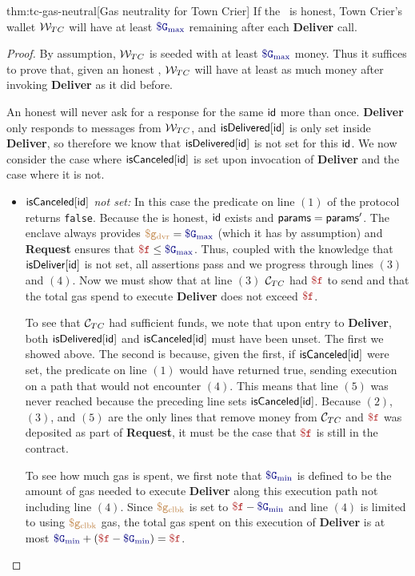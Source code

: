 \begin{retheorem}{thm:tc-gas-neutral}[Gas neutrality for Town Crier]
If the \tc~\medname is honest,
Town Crier's wallet ${\cal W}_{TC}$ will have at least $\constgasmax$ remaining after each {\bf Deliver} call.
\end{retheorem}

\begin{proof}
By assumption, ${\cal W}_{TC}$ is seeded with at least $\constgasmax$ money.
Thus it suffices to prove that, given an honest \medname, ${\cal W}_{TC}$ will have at least as much money after invoking {\bf Deliver} as it did before.

An honest \medname will never ask for a response for the same ${\sf id}$ more than once.
{\bf Deliver} only responds to messages from ${\cal W}_{TC}$, and ${\sf isDelivered}[{\sf id}]$ is only set inside {\bf Deliver},
so therefore we know that ${\sf isDelivered}[{\sf id}]$ is not set for this ${\sf id}$.
We now consider the case where ${\sf isCanceled}[{\sf id}]$ is set upon invocation of {\bf Deliver} and the case where it is not.
\begin{itemize}

\item {\it ${\sf isCanceled}[{\sf id}]$ not set:}
In this case the predicate on line $(1)$ of the protocol returns {\tt false}.
Because the \medname is honest, ${\sf id}$ exists and ${\sf params} = {\sf params}'$.
The enclave always provides $\gasdeliver = \constgasmax$ (which it has by assumption) and {\bf Request} ensures that $\fee \leq \constgasmax$.
Thus, coupled with the knowledge that ${\sf isDeliver}[{\sf id}]$ is not set, all assertions pass and we progress through lines $(3)$ and $(4)$.
Now we must show that at line $(3)$ ${\cal C}_{TC}$ had $\fee$ to send and that the total gas spend to execute {\bf Deliver} does not exceed $\fee$.

To see that ${\cal C}_{TC}$ had sufficient funds, we note that upon entry to {\bf Deliver}, both ${\sf isDelivered}[{\sf id}]$ and ${\sf isCanceled}[{\sf id}]$ must have been unset.
The first we showed above.
The second is because, given the first, if ${\sf isCanceled}[{\sf id}]$ were set, the predicate on line $(1)$ would have returned true, sending execution on a path that would not encounter $(4)$.
This means that line $(5)$ was never reached because the preceding line sets ${\sf isCanceled}[{\sf id}]$.
Because $(2)$, $(3)$, and $(5)$ are the only lines that remove money from ${\cal C}_{TC}$ and $\fee$ was deposited as part of {\bf Request},
it must be the case that $\fee$ is still in the contract.

To see how much gas is spent, we first note that $\constgasmin$ is defined to be the amount of gas needed to execute {\bf Deliver} along this execution path not including line $(4)$.
Since $\textcolor{brown}{\tt \$g_\text{clbk}}$ is set to $\fee - \constgasmin$ and line $(4)$ is limited to using $\textcolor{brown}{\tt \$g_\text{clbk}}$ gas,
the total gas spent on this execution of {\bf Deliver} is at most $\constgasmin + (\fee - \constgasmin) = \fee$.



\end{itemize}
\end{proof}
